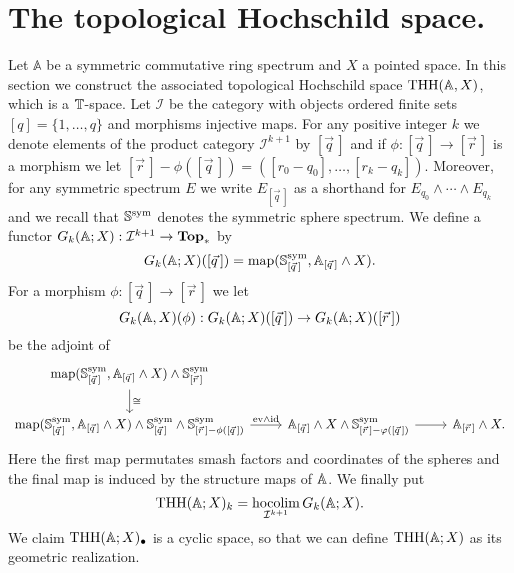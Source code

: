 \section{The topological Hochschild space.}
Let $\mathbb{A}$ be a symmetric commutative ring spectrum and $X$ a pointed space. In this section we construct the associated topological Hochschild space $\mathrm{THH}(\mathbb{A},X)$, which is a $\mathbb{T}$-space. Let $\mathcal{I}$ be the category with objects ordered finite sets $[q]=\{1,\ldots, q\}$ and morphisms injective maps. For any positive integer $k$ we denote elements of
the product category $\mathcal{I}^{k+1}$ by $[\vec{q}\,]$ and if $\phi:[\vec{q}\,]\to [\vec{r}\,]$
is a morphism we let $[\vec{r}\,]- \phi ([\vec{q}\,]) = ([r_0-q_0],\ldots, [r_k-q_k])$. Moreover, for
any symmetric spectrum $E$ we write $E_{[\vec{q}\,]}$ as a shorthand for  $E_{q_0}\wedge\cdots \wedge E_{q_k}$
and we recall that
$\mathbb{S}^{\mathrm{sym}}$ denotes the symmetric sphere spectrum.
We define a functor $G_k(\mathbb{A};X):\mathcal{I}^{k+1}\rightarrow \mathbf{Top}_\ast$ by
\[G_k(\mathbb{A};X)([\vec{q}\,])=\mathrm{map}(\mathbb{S}^{\mathrm{sym}}_{[\vec{q}\,]},\mathbb{A}_{[\vec{q}\,]}\wedge X).\]
For a morphism $\phi:[\vec{q}\,]\to [\vec{r}\,]$ we let
\[ G_k(\mathbb{A},X)(\phi): G_k(\mathbb{A};X)([\vec{q}\,])\to G_k(\mathbb{A};X)([\vec{r}\,])\]
be the adjoint of 
\[
\begin{tikzcd}
 \map(\spherespectrum^{\mathrm{sym}}_{[\vec{q}\,]},\A_{[\vec{q}\,]}\wedge X) \wedge
\spherespectrum^{\mathrm{sym}}_{[\vec{r}\,]} 
\arrow{d}{\cong}\\
\map(\spherespectrum^{\mathrm{sym}}_{[\vec{q}\,]},\A_{[\vec{q}\,]}\wedge X) \wedge
\spherespectrum^{\mathrm{sym}}_{[\vec{q}\,]}\wedge \spherespectrum^{\mathrm{sym}}_{[\vec{r}\,]- \phi ([\vec{q}\,])} 
\arrow{r}{\mathrm{ev}\wedge \mathrm {id}}
&\A_{[\vec{q}\,]}\wedge X\wedge \spherespectrum^{\mathrm{sym}}_{[\vec{r}\,]- \varphi ([\vec{q}\,])}
\arrow{r} 
&\A_{[\vec{r}\,]}\wedge X.
\end{tikzcd}
\]
Here the first map permutates smash factors and coordinates of the spheres and
the final map is induced by the structure maps of $\mathbb{A}$.
We finally put 
$$\text{THH}(\mathbb{A};X)_k = \underset{\mathcal{I}^{k+1}}{\mathrm{hocolim}}\, G_k(\mathbb{A};X).$$
We claim $\mathrm{THH}(\mathbb{A};X)_\bullet$ is a cyclic space, so that we can define $\mathrm{THH}(\mathbb{A};X)$
as its geometric realization.

